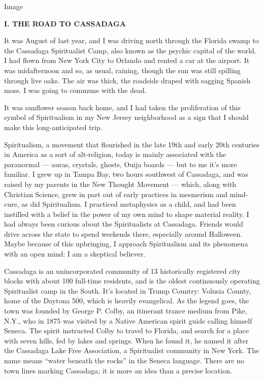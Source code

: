 Image

\textbf{I. THE ROAD TO CASSADAGA}

It was August of last year, and I was driving north through the Florida
swamp to the Cassadaga Spiritualist Camp, also known as the psychic
capital of the world. I had flown from New York City to Orlando and
rented a car at the airport. It was midafternoon and so, as usual,
raining, though the sun was still spilling through live oaks. The air
was thick, the roadside draped with sagging Spanish moss. I was going to
commune with the dead.

It was sunflower season back home, and I had taken the proliferation of
this symbol of Spiritualism in my New Jersey neighborhood as a sign that
I should make this long-anticipated trip.

Spiritualism, a movement that flourished in the late 19th and early 20th
centuries in America as a sort of alt-religion, today is mainly
associated with the paranormal --- auras, crystals, ghosts, Ouija boards
--- but to me it's more familiar. I grew up in Tampa Bay, two hours
southwest of Cassadaga, and was raised by my parents in the New Thought
Movement --- which, along with Christian Science, grew in part out of
early practices in mesmerism and mind-cure, as did Spiritualism. I
practiced metaphysics as a child, and had been instilled with a belief
in the power of my own mind to shape material reality. I had always been
curious about the Spiritualists at Cassadaga. Friends would drive across
the state to spend weekends there, especially around Halloween. Maybe
because of this upbringing, I approach Spiritualism and its phenomena
with an open mind: I am a skeptical believer.

Cassadaga is an unincorporated community of 13 historically registered
city blocks with about 100 full-time residents, and is the oldest
continuously operating Spiritualist camp in the South. It's located in
Trump Country: Volusia County, home of the Daytona 500, which is heavily
evangelical. As the legend goes, the town was founded by George P.
Colby, an itinerant trance medium from Pike, N.Y., who in 1875 was
visited by a Native American spirit guide calling himself Seneca. The
spirit instructed Colby to travel to Florida, and search for a place
with seven hills, fed by lakes and springs. When he found it, he named
it after the Cassadaga Lake Free Association, a Spiritualist community
in New York. The name means ``water beneath the rocks'' in the Seneca
language. There are no town lines marking Cassadaga; it is more an idea
than a precise location.

